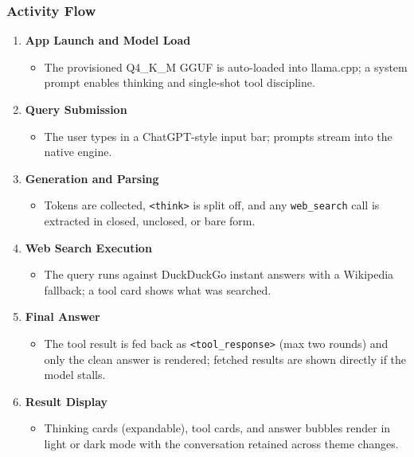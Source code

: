 \documentclass[12pt,a4paper]{report}
\begin{document}
\subsubsection{Activity Flow}
\begin{enumerate}
    \item \textbf{App Launch and Model Load}
    \begin{itemize}
        \item The provisioned Q4\_K\_M GGUF is auto-loaded into llama.cpp; a system prompt enables thinking and single-shot tool discipline.
    \end{itemize}

    \item \textbf{Query Submission}
    \begin{itemize}
        \item The user types in a ChatGPT-style input bar; prompts stream into the native engine.
    \end{itemize}

    \item \textbf{Generation and Parsing}
    \begin{itemize}
        \item Tokens are collected, \texttt{<think>} is split off, and any \texttt{web\_search} call is extracted in closed, unclosed, or bare form.
    \end{itemize}

    \item \textbf{Web Search Execution}
    \begin{itemize}
        \item The query runs against DuckDuckGo instant answers with a Wikipedia fallback; a tool card shows what was searched.
    \end{itemize}

    \item \textbf{Final Answer}
    \begin{itemize}
        \item The tool result is fed back as \texttt{<tool\_response>} (max two rounds) and only the clean answer is rendered; fetched results are shown directly if the model stalls.
    \end{itemize}

    \item \textbf{Result Display}
    \begin{itemize}
        \item Thinking cards (expandable), tool cards, and answer bubbles render in light or dark mode with the conversation retained across theme changes.
    \end{itemize}
\end{enumerate}
\end{document}
